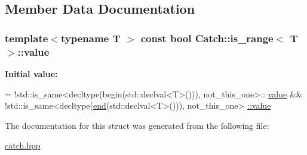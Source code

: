 \subsection{Member Data Documentation}
\hypertarget{struct_catch_1_1is__range_afaec39e819c3956829cbbd00feba11be}{
\subsubsection[{value}]{\setlength{\rightskip}{0pt plus 5cm}template$<$typename T $>$ const bool {\bf Catch\-::is\-\_\-range}$<$ T $>$\-::value\hspace{0.3cm}{\ttfamily [static]}}}\label{struct_catch_1_1is__range_afaec39e819c3956829cbbd00feba11be}
{\bfseries Initial value\-:}
\begin{DoxyCode}
=
            !std::is\_same<decltype(begin(std::declval<T>())), not\_this\_one>::
      \hyperlink{struct_catch_1_1is__range_afaec39e819c3956829cbbd00feba11be}{value} &&
            !std::is\_same<decltype(\hyperlink{namespace_catch_a71fef6a57614eb2d9751f8586ff6de6a}{end}(std::declval<T>())), not\_this\_one>
      \hyperlink{struct_catch_1_1is__range_afaec39e819c3956829cbbd00feba11be}{::value}
\end{DoxyCode}


The documentation for this struct was generated from the following file\-:\begin{DoxyCompactItemize}
\item 
\hyperlink{catch_8hpp}{catch.\-hpp}\end{DoxyCompactItemize}
